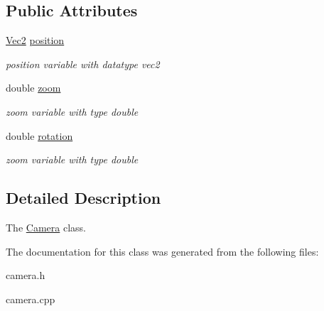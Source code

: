 \subsection*{Public Attributes}
\begin{DoxyCompactItemize}
\item 
\mbox{\label{classCamera_a3d0e40ef5f4f22a013991bc46603c16b}} 
\hyperlink{classVec2}{Vec2} \hyperlink{classCamera_a3d0e40ef5f4f22a013991bc46603c16b}{position}
\begin{DoxyCompactList}\small\item\em position variable with datatype vec2 \end{DoxyCompactList}\item 
\mbox{\label{classCamera_a3b777eab5439277827678d7aeb95315b}} 
double \hyperlink{classCamera_a3b777eab5439277827678d7aeb95315b}{zoom}
\begin{DoxyCompactList}\small\item\em zoom variable with type double \end{DoxyCompactList}\item 
\mbox{\label{classCamera_a15c8b64066eda81920a6eac3cc8b86ca}} 
double \hyperlink{classCamera_a15c8b64066eda81920a6eac3cc8b86ca}{rotation}
\begin{DoxyCompactList}\small\item\em zoom variable with type double \end{DoxyCompactList}\end{DoxyCompactItemize}


\subsection{Detailed Description}
The \hyperlink{classCamera}{Camera} class. 

The documentation for this class was generated from the following files\+:\begin{DoxyCompactItemize}
\item 
camera.\+h\item 
camera.\+cpp\end{DoxyCompactItemize}
